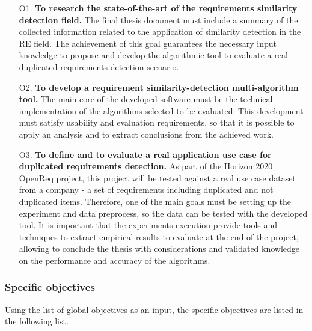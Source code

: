 \documentclass[11pt]{article}
\begin{document}
\begin{enumerate}
\item[O1.] \textbf{To research the state-of-the-art of the requirements similarity detection field.} The final thesis document must include a summary of the collected information related to the application of similarity detection in the RE field. The achievement of this goal guarantees the necessary input knowledge to propose and develop the algorithmic tool to evaluate a real duplicated requirements detection scenario.
\item[O2.] \textbf{To develop a requirement similarity-detection multi-algorithm tool.} The main core of the developed software must be the technical implementation of the algorithms selected to be evaluated. This development must satisfy usability and evaluation requirements, so that it is possible to apply an analysis and to extract conclusions from the achieved work.
\item[O3.] \textbf{To define and to evaluate a real application use case for duplicated requirements detection.} As part of the Horizon 2020 OpenReq project, this project will be tested against a real use case dataset from a company - a set of requirements including duplicated and not duplicated items. Therefore, one of the main goals must be setting up the experiment and data preprocess, so the data can be tested with the developed tool. It is important that the experiments execution provide tools and techniques to extract empirical results to evaluate at the end of the project, allowing to conclude the thesis with considerations and validated knowledge on the performance and accuracy of the algorithms.
\end{enumerate}

\subsubsection{Specific objectives}
\label{sec:spec_objectives}

Using the list of global objectives as an input, the specific objectives are listed in the following list.
\end{document}
